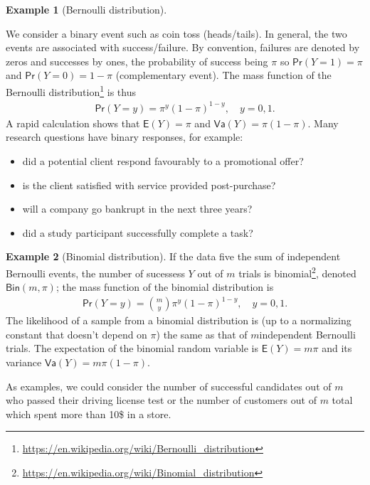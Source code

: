 \documentclass[
  11pt,
  letterpaper,
]{book}
\providecommand{\tightlist}{%
  \setlength{\itemsep}{0pt}\setlength{\parskip}{0pt}}
\renewcommand{\href}[2]{#2\footnote{\url{#1}}}
\theoremstyle{definition}
\theoremstyle{definition}
\newtheorem{example}{Example}[chapter]
\theoremstyle{definition}
\theoremstyle{definition}
\theoremstyle{remark}
\begin{document}
\begin{example}[Bernoulli distribution]
\protect\hypertarget{exm:bernoullidist}{}\label{exm:bernoullidist}

We consider a binary event such as coin toss (heads/tails). In general, the two events are associated with success/failure. By convention, failures are denoted by zeros and successes by ones, the probability of success being \(\pi\) so \(\mathsf{Pr}(Y=1)=\pi\) and \(\mathsf{Pr}(Y=0)=1-\pi\) (complementary event). The mass function of the \href{https://en.wikipedia.org/wiki/Bernoulli_distribution}{Bernoulli distribution} is thus
\begin{align*}
\mathsf{Pr}(Y=y) = \pi^y (1-\pi)^{1-y}, \quad y=0, 1.
\end{align*}
A rapid calculation shows that \(\mathsf{E}(Y)=\pi\) and \(\mathsf{Va}(Y)=\pi(1-\pi)\).
Many research questions have binary responses, for example:

\begin{itemize}
\tightlist
\item
  did a potential client respond favourably to a promotional offer?
\item
  is the client satisfied with service provided post-purchase?
\item
  will a company go bankrupt in the next three years?
\item
  did a study participant successfully complete a task?
\end{itemize}

\end{example}

\begin{example}[Binomial distribution]
\protect\hypertarget{exm:binomialdist}{}\label{exm:binomialdist}If the data five the sum of independent Bernoulli events, the number of sucessess \(Y\) out of \(m\) trials is \href{https://en.wikipedia.org/wiki/Binomial_distribution}{binomial}, denoted \(\mathsf{Bin}(m, \pi)\); the mass function of the binomial distribution is
\begin{align*}
\mathsf{Pr}(Y=y) = \binom{m}{y}\pi^y (1-\pi)^{1-y}, \quad y=0, 1.
\end{align*}
The likelihood of a sample from a binomial distribution is (up to a normalizing constant that doesn't depend on \(\pi\)) the same as that of \(m\)independent Bernoulli trials. The expectation of the binomial random variable is \(\mathsf{E}(Y)=m\pi\) and its variance \(\mathsf{Va}(Y)=m\pi(1-\pi)\).

As examples, we could consider the number of successful candidates out of \(m\) who passed their driving license test or the number of customers out of \(m\) total which spent more than 10\$ in a store.
\end{example}
\end{document}

